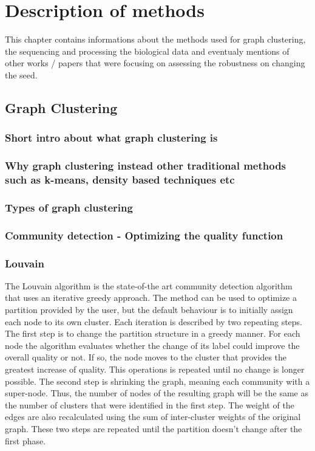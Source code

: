 \chapter{Description of methods}

This chapter contains informations about the methods used for graph clustering, the sequencing and processing the biological data and eventualy mentions of other works / papers that were focusing on assessing the robustness on changing the seed.

\section{Graph Clustering}

\subsection{Short intro about what graph clustering is}

\subsection{Why graph clustering instead other traditional methods such as k-means, density based techniques etc}

\subsection{Types of graph clustering}

\subsection{Community detection - Optimizing the quality function}

\subsection{Louvain}
The Louvain algorithm \cite{Blondel2008b} is the state-of-the art community detection algorithm that uses an iterative greedy approach. The method can be used to optimize a partition provided by the user, but the default behaviour is to initially assign each node to its own cluster.
Each iteration is described by two repeating steps. The first step is to change the partition structure in a greedy manner. For each node the algorithm evaluates whether the change of its label could improve the overall quality or not. If so, the node moves to the cluster that provides the greatest increase of quality. This operations is repeated until no change is longer possible. The second step is shrinking the graph, meaning each community with a super-node. Thus, the number of nodes of the resulting graph will be the same as the number of clusters that were identified in the first step. The weight of the edges are also recalculated using the sum of inter-cluster weights of the original graph.
These two steps are repeated until the partition doesn't change after the first phase.

